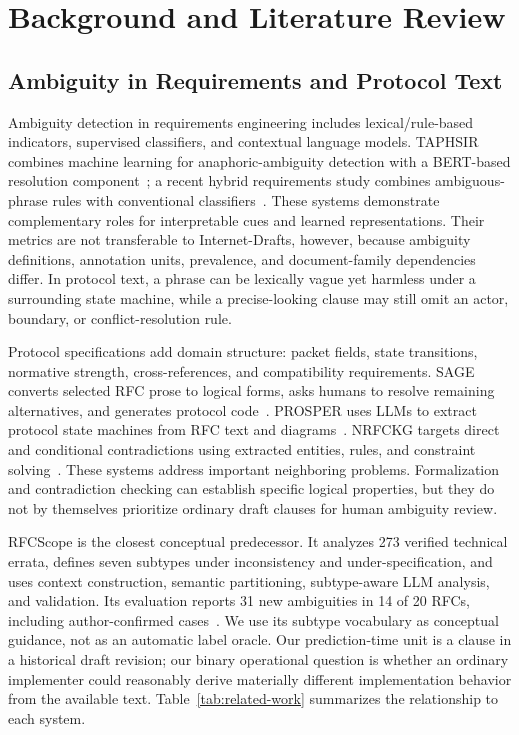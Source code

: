 \documentclass[12pt,a4paper,oneside]{report}
\begin{document}
\chapter{Background and Literature Review}

\section{Ambiguity in Requirements and Protocol Text}

Ambiguity detection in requirements engineering includes lexical/rule-based indicators, supervised classifiers, and contextual language models. TAPHSIR combines machine learning for anaphoric-ambiguity detection with a BERT-based resolution component~\cite{ezzini2022taphsir}; a recent hybrid requirements study combines ambiguous-phrase rules with conventional classifiers~\cite{izhar2025ambiguity}. These systems demonstrate complementary roles for interpretable cues and learned representations. Their metrics are not transferable to Internet-Drafts, however, because ambiguity definitions, annotation units, prevalence, and document-family dependencies differ. In protocol text, a phrase can be lexically vague yet harmless under a surrounding state machine, while a precise-looking clause may still omit an actor, boundary, or conflict-resolution rule.

Protocol specifications add domain structure: packet fields, state transitions, normative strength, cross-references, and compatibility requirements. SAGE converts selected RFC prose to logical forms, asks humans to resolve remaining alternatives, and generates protocol code~\cite{yen2021sage}. PROSPER uses LLMs to extract protocol state machines from RFC text and diagrams~\cite{sharma2024prosper}. NRFCKG targets direct and conditional contradictions using extracted entities, rules, and constraint solving~\cite{feng2023nrfckg}. These systems address important neighboring problems. Formalization and contradiction checking can establish specific logical properties, but they do not by themselves prioritize ordinary draft clauses for human ambiguity review.

RFCScope is the closest conceptual predecessor. It analyzes 273 verified technical errata, defines seven subtypes under inconsistency and under-specification, and uses context construction, semantic partitioning, subtype-aware LLM analysis, and validation. Its evaluation reports 31 new ambiguities in 14 of 20 RFCs, including author-confirmed cases~\cite{pawagi2025rfcscope}. We use its subtype vocabulary as conceptual guidance, not as an automatic label oracle. Our prediction-time unit is a clause in a historical draft revision; our binary operational question is whether an ordinary implementer could reasonably derive materially different implementation behavior from the available text. Table~\ref{tab:related-work} summarizes the relationship to each system.
\end{document}
